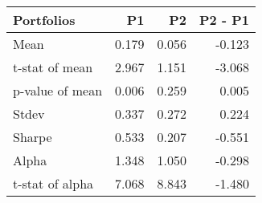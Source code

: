 \begin{tabular}{lrrr}
\toprule
Portfolios & P1 & P2 & P2 - P1 \\
\midrule
Mean & 0.179 & 0.056 & -0.123 \\
t-stat of mean & 2.967 & 1.151 & -3.068 \\
p-value of mean & 0.006 & 0.259 & 0.005 \\
Stdev & 0.337 & 0.272 & 0.224 \\
Sharpe & 0.533 & 0.207 & -0.551 \\
Alpha & 1.348 & 1.050 & -0.298 \\
t-stat of alpha & 7.068 & 8.843 & -1.480 \\
\bottomrule
\end{tabular}
